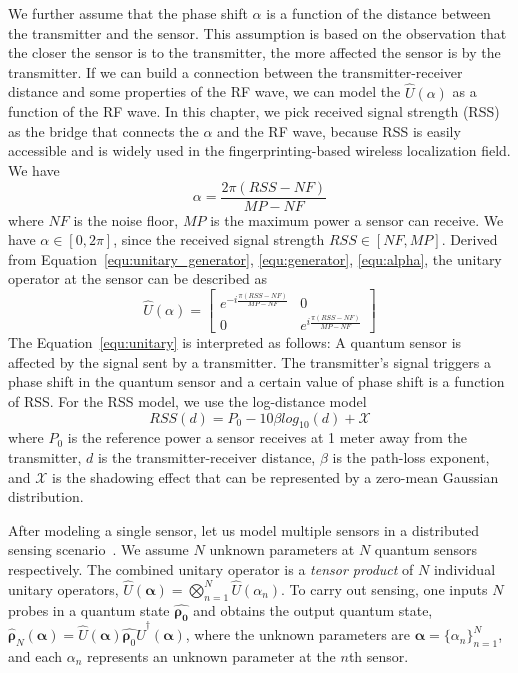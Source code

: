 We further assume that the phase shift $\alpha$ is a function of the distance between the transmitter and the sensor.
This assumption is based on the observation that the closer the sensor is to the transmitter, the more affected the sensor is by the transmitter.
If we can build a connection between the transmitter-receiver distance and some properties of the RF wave, we can model the $\hat{U}(\alpha)$ as a function of the RF wave.
In this chapter, we pick received signal strength (RSS) as the bridge that connects the $\alpha$ and the RF wave, because RSS is easily accessible and is widely used in the fingerprinting-based wireless localization field.
We have
\begin{equation}
    \alpha = \frac{2\pi (RSS - NF)}{MP-NF}
    \label{equ:alpha}
\end{equation}
where $NF$ is the noise floor, $MP$ is the maximum power a sensor can receive. 
We have $\alpha \in [0, 2\pi]$, since the received signal strength $RSS \in [NF, MP]$.
Derived from Equation~\ref{equ:unitary_generator}, \ref{equ:generator}, \ref{equ:alpha}, the unitary operator at the sensor can be described as
\begin{equation}
    \hat{U}(\alpha)   = 
    \begin{bmatrix}
    e^{- i \frac{\pi (RSS - NF)}{MP-NF}} & 0\\
    0 & e^{ i \frac{\pi (RSS - NF)}{MP-NF}}
    \end{bmatrix}
    \label{equ:unitary}
\end{equation}
The Equation~\ref{equ:unitary} is interpreted as follows: A quantum sensor is affected by the signal sent by a transmitter.
The transmitter's signal triggers a phase shift in the quantum sensor and a certain value of phase shift is a function of RSS. 
For the RSS model, we use the log-distance model
\begin{equation}
    RSS(d) = P_0 - 10\beta log_{10}(d) + \mathcal{X}
    \label{equ:propagation}
\end{equation}
where $P_0$ is the reference power a sensor receives at 1 meter away from the transmitter, $d$ is the transmitter-receiver distance, $\beta$ is the path-loss exponent, and $\mathcal{X}$ is the shadowing effect that can be represented by a zero-mean Gaussian distribution.

After modeling a single sensor, let us model multiple sensors in a distributed sensing scenario~\cite{Zhang_2021}.
We assume $N$ unknown parameters at $N$ quantum sensors respectively. 
The combined unitary operator is a \emph{tensor product} of $N$ individual unitary operators,
$\hat{U}(\boldsymbol{\alpha}) = \bigotimes_{n=1}^{N} \hat{U}(\alpha_n)$.
To carry out sensing, one inputs $N$ probes in a quantum state $\hat{\boldsymbol{\rho_0}}$ and obtains the output quantum state,
$\hat{\boldsymbol{\rho}}_N({\boldsymbol{\alpha}}) = \hat{U}(\boldsymbol{\alpha}) \hat{\boldsymbol{\rho}_0} \hat{U}^{\dagger}(\boldsymbol{\alpha})$,
where the unknown parameters are $\boldsymbol{\alpha}=\{\alpha_n\}_{n=1}^{N}$, and each $\alpha_n$ represents an unknown parameter at the $n$th sensor. 


